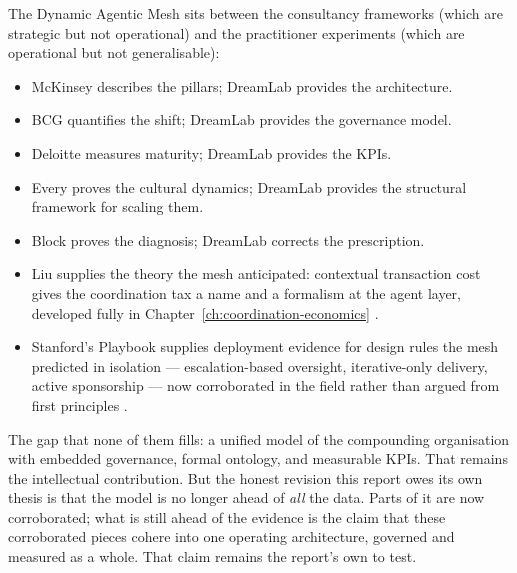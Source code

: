 \begin{keyinsight}[title={The Positioning Opportunity}]
The Dynamic Agentic Mesh sits between the consultancy frameworks (which are strategic but not operational) and the practitioner experiments (which are operational but not generalisable):
\begin{itemize}
  \item McKinsey describes the pillars; DreamLab provides the architecture.
  \item BCG quantifies the shift; DreamLab provides the governance model.
  \item Deloitte measures maturity; DreamLab provides the KPIs.
  \item Every proves the cultural dynamics; DreamLab provides the structural framework for scaling them.
  \item Block proves the diagnosis; DreamLab corrects the prescription.
  \item Liu supplies the theory the mesh anticipated: contextual transaction cost gives the coordination tax a name and a formalism at the agent layer, developed fully in Chapter~\ref{ch:coordination-economics} \parencite{Liu2026}.
  \item Stanford's Playbook supplies deployment evidence for design rules the mesh predicted in isolation --- escalation-based oversight, iterative-only delivery, active sponsorship --- now corroborated in the field rather than argued from first principles \parencite{Pereira2026Playbook}.
\end{itemize}

The gap that none of them fills: a unified model of the compounding organisation with embedded governance, formal ontology, and measurable KPIs. That remains the intellectual contribution. But the honest revision this report owes its own thesis is that the model is no longer ahead of \emph{all} the data. Parts of it are now corroborated; what is still ahead of the evidence is the claim that these corroborated pieces cohere into one operating architecture, governed and measured as a whole. That claim remains the report's own to test.
\end{keyinsight}
